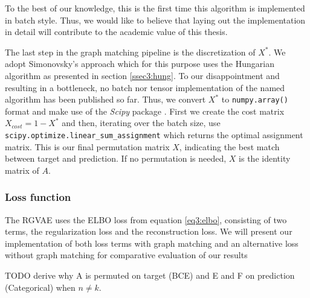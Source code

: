 To the best of our knowledge, this is the first time this algorithm is implemented in batch style. Thus, we would like to believe that laying out the implementation in detail will contribute to the academic value of this thesis.  

The last step in the graph matching pipeline is the discretization of $X^*$. We adopt Simonovsky's \cite{simonovsky_graphvae_2018} approach which for this purpose uses the Hungarian algorithm as presented in section \ref{ssec3:hung}. To our disappointment and resulting in a bottleneck, no batch nor tensor implementation of the named algorithm has been published so far. Thus, we convert $X^*$ to \texttt{numpy.array()} format and make use of the \textit{Scipy} package \cite{2020SciPy-NMeth}. First we create the cost matrix $X_{cost} = 1 - X^*$ and then, iterating over the batch size, use \texttt{scipy.optimize.linear\_sum\_assignment} which returns the optimal assignment matrix. This is our final permutation matrix $X$, indicating the best match between target and prediction. If no permutation is needed, $X$ is the identity matrix of $A$.




\subsubsection{Loss function}
\label{ssec4:loss}

The RGVAE uses the ELBO loss from equation \ref{eq3:elbo}, consisting of two terms, the regularization loss and the reconstruction loss. We will present our implementation of both loss terms with graph matching and an alternative loss without graph matching for comparative evaluation of our results 


TODO derive why A is permuted on target (BCE) and E and F on prediction (Categorical) when $n \neq k$.

